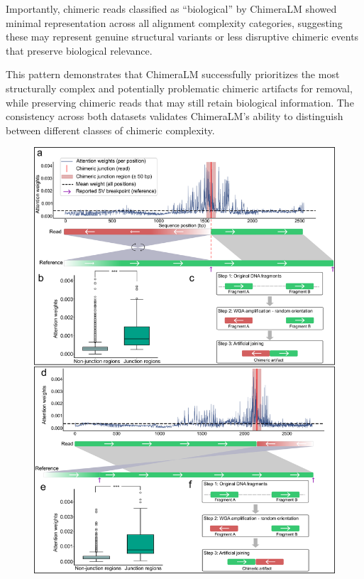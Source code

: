 \documentclass[pdflatex,sn-nature]{sn-jnl}%
\theoremstyle{thmstyleone}%
\theoremstyle{thmstyletwo}%
\theoremstyle{thmstylethree}%
\begin{document}
Importantly, chimeric reads classified as ``biological'' by ChimeraLM showed minimal representation across all alignment complexity categories, suggesting these may represent genuine structural variants or less disruptive chimeric events that preserve biological relevance.

This pattern demonstrates that ChimeraLM successfully prioritizes the most structurally complex and potentially problematic chimeric artifacts for removal, while preserving chimeric reads that may still retain biological information.
The consistency across both datasets validates ChimeraLM's ability to distinguish between different classes of chimeric complexity.

\begin{figure}[!ht]
	\begin{center}
		\includegraphics[width=\textwidth]{final_figures/figure4}
	\end{center}

\end{figure}
\end{document}
